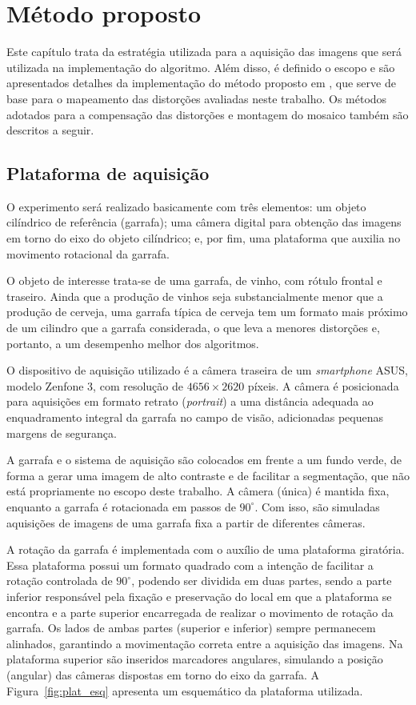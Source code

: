 \chapter{Método proposto} 

Este capítulo trata da estratégia utilizada para a aquisição das imagens que será utilizada na implementação do algoritmo. Além disso, é definido o escopo e são apresentados detalhes da implementação do método proposto em \cite{Lin:2013}, que serve de base para o mapeamento das distorções avaliadas neste trabalho. Os métodos adotados para a compensação das distorções e montagem do mosaico também  são descritos a seguir.

\section{Plataforma de aquisição}
O experimento será realizado basicamente com três elementos: um objeto cilíndrico de referência (garrafa); uma câmera digital para obtenção das imagens em torno do eixo do objeto cilíndrico; e, por fim, uma plataforma que auxilia no movimento rotacional da garrafa.

O objeto de interesse trata-se de uma garrafa, de vinho, com rótulo frontal e traseiro. Ainda que a produção de vinhos seja substancialmente menor que a produção de cerveja, uma garrafa típica de cerveja tem um formato mais próximo de um cilindro que a garrafa considerada, o que leva a menores distorções e, portanto, a um desempenho melhor dos algoritmos.     

O dispositivo de aquisição utilizado é a câmera traseira de um \textit{smartphone} ASUS, modelo Zenfone 3, com resolução de $4656 \times 2620$ píxeis. A câmera é posicionada para aquisições em formato retrato (\textit{portrait}) a uma distância adequada ao enquadramento integral da garrafa no campo de visão, adicionadas pequenas margens de segurança. 

A garrafa e o sistema de aquisição são colocados em frente a um fundo verde, de forma a gerar uma imagem de alto contraste e de facilitar a segmentação, que não está propriamente no escopo deste trabalho. A câmera (única) é mantida fixa, enquanto a garrafa é rotacionada em passos de $90^\circ$. Com isso, são simuladas aquisições de imagens de uma garrafa fixa a partir de diferentes câmeras.

A rotação da garrafa é implementada com o auxílio de uma plataforma giratória. Essa plataforma possui um formato quadrado com a intenção de facilitar a rotação controlada de $90^\circ$, podendo ser dividida em duas partes, sendo a parte inferior responsável pela fixação e preservação do local em que a plataforma se encontra e a parte superior encarregada de realizar o movimento de rotação da garrafa. Os lados de ambas partes (superior e inferior) sempre permanecem alinhados, garantindo a movimentação correta entre a aquisição das imagens. Na plataforma superior são inseridos marcadores angulares, simulando a posição (angular) das câmeras dispostas em torno do eixo da garrafa. A Figura~\ref{fig:plat_esq} apresenta um esquemático da plataforma utilizada.

